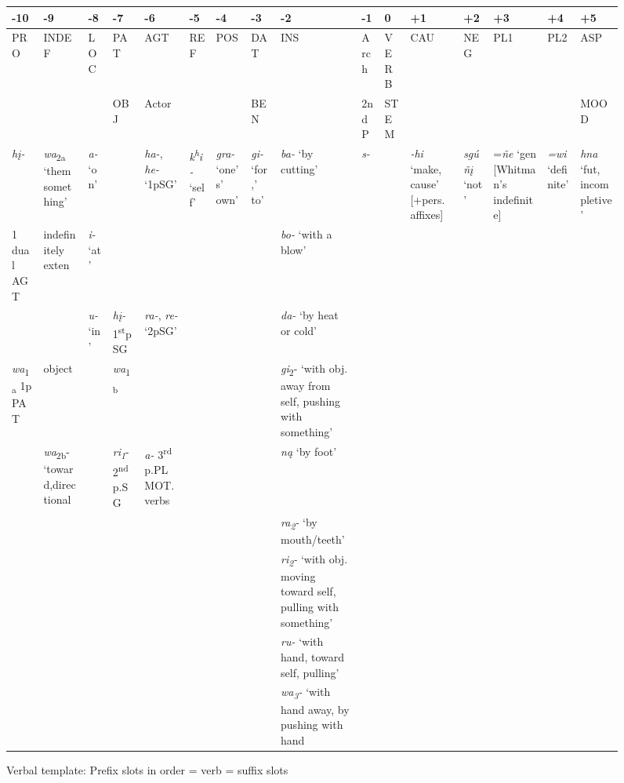 \documentclass[output=paper]{LSP/langsci}
\begin{document}
\begin{sidewaysfigure}
\caption{Verbal template: Prefix slots in order = verb = suffix slots}
\scriptsize
\begin{tabularx}{\textwidth}{  X  p{1.5cm}  X  p{1cm}  p{.7cm}  p{.5cm}  X   X  p{2cm} l l   p{1cm}  X  p{1cm}  X  X }
\midrule
-10 & -9 & -8 & -7 & -6 & -5 & -4 & -3 & -2 & -1 & 0 & +1 & +2 & +3 & +4 & +5 \\
\midrule
PRO & INDEF & LOC & PAT & AGT & REF & POS & DAT & INS & Arch & VERB & CAU & NEG & PL1 & PL2 & ASP \\
& & & OBJ & Actor & & & BEN & & 2ndP & STEM & & & & & MOOD \\
\midrule
\textit{h\k{i}-} & \textit{wa}\textsubscript{2a}  `them  something'& \textit{a-} `on' &  & \textit{ha-}, \textit{he-}  `1pSG'  & \textit{k\textsuperscript{h}i-}  `self' & \textit{gra-}  `one's'  own'& \textit{gi-}  `for,' to' & \textit{ba-} `by cutting' & \textit{s-} & & \textit{-hi} `make,  cause' [+pers. affixes]  & \textit{sgú\~n\k{i}}  `not'& =\textit{\~ne}  `gen [Whitman's indefinite] & \textit{=wi}  `definite' & \textit{hna} `fut,  incompletive'  \\
1 dual AGT & indefinitely  exten  & \textit{i-} `at' & && &&& \textit{bo-} `with a blow' & & && &  &  & \\ 
&& \textit{u-} `in' & \textit{h\k{i}-}  1\textsuperscript{st}p  SG & \textit{ra-}, \textit{re-}  `2pSG'  & & & & \textit{da-} `by heat  or cold'  & & & & &   & & \\ 
\textit{wa}\textsubscript{1a} 1p PAT & object & & \textit{wa}\textsubscript{1b} &  & & &  &  \textit{gi}\textsubscript{2}- `with  obj. away  from self,   pushing   with something'& & & & & & & \\
& \textit{wa}\textsubscript{2b}-  `toward,directional  & & \textit{ri\textsubscript{1}}-  2\textsuperscript{nd}  p.SG & \textit{a-}  3\textsuperscript{rd} p.PL  MOT. verbs   &  && & \textit{n\k{a}} `by foot' & & & & & & &\\
& & & & & & & & \textit{ra\textsubscript{2}-} `by mouth/teeth'  & & & & & & & \\ 
\midrule
& & & & & & & & \textit{ri\textsubscript{2}-} `with obj.  moving  toward self, pulling with  something' & & & & & & & \\ 
& & & & & & & & \textit{ru-} `with  hand, toward  self, pulling' & & & & & & & \\ 
& & & & & & & & \textit{wa\textsubscript{3}-} `with  hand away, by pushing  with hand& & & & & & & \\ 
\midrule
\end{tabularx}
\end{sidewaysfigure}
\end{document}
